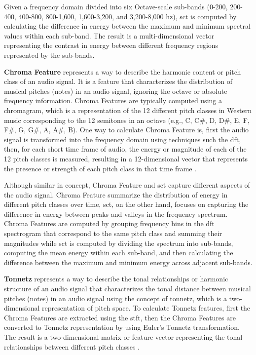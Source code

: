 Given a frequency domain divided into six Octave-scale sub-bands (0-200, 200-400, 400-800, 800-1,600, 1,600-3,200, and 3,200-8,000 \gls{hz}), \gls{sct} is computed by calculating the difference in energy between the maximum and minimum spectral values within each sub-band. The result is a multi-dimensional vector representing the contrast in energy between different frequency regions represented by the sub-bands.

\textbf{Chroma Feature} represents a way to describe the harmonic content or pitch class of an audio signal. It is a feature that characterizes the distribution of musical pitches (notes) in an audio signal, ignoring the octave or absolute frequency information. Chroma Features are typically computed using a chromagram, which is a representation of the 12 different pitch classes in Western music corresponding to the 12 semitones in an octave (e.g., C, C\#, D, D\#, E, F, F\#, G, G\#, A, A\#, B). One way to calculate Chroma Feature is, first the audio signal is transformed into the frequency domain using techniques such the \gls{dft}, then, for each short time frame of audio, the energy or magnitude of each of the 12 pitch classes is measured, resulting in a 12-dimensional vector that represents the presence or strength of each pitch class in that time frame \cite{Bartsch2005}.

Although similar in concept, Chroma Feature and \gls{sct} capture different aspects of the audio signal. Chroma Feature summarize the distribution of energy in different pitch classes over time, \gls{sct}, on the other hand, focuses on capturing the difference in energy between peaks and valleys in the frequency spectrum. Chroma Features are computed by grouping frequency bins in the \gls{dft} spectrogram that correspond to the same pitch class and summing their magnitudes while \gls{sct} is computed by dividing the spectrum into sub-bands, computing the mean energy within each sub-band, and then calculating the difference between the maximum and minimum energy across adjacent sub-bands.

\textbf{Tonnetz} represents a way to describe the tonal relationships or harmonic structure of an audio signal that characterizes the tonal distance between musical pitches (notes) in an audio signal using the concept of tonnetz, which is a two-dimensional representation of pitch space. To calculate Tonnetz features, first the Chroma Features are extracted using the \gls{stft}, then the Chroma Features are converted to Tonnetz representation by using Euler's Tonnetz transformation. The result is a two-dimensional matrix or feature vector representing the tonal relationships between different pitch classes \cite{Harte2006}.

